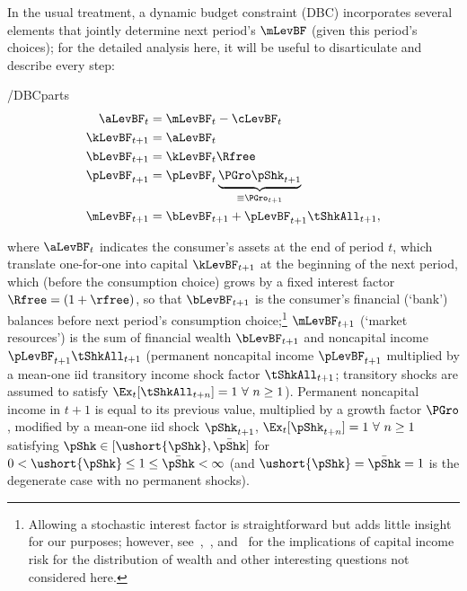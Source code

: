 \documentclass[BufferStockTheory]{subfiles}
\begin{document}
In the usual treatment, a dynamic budget constraint (DBC) incorporates
several elements that jointly determine next period's $\mLevBF$ (given this
period's choices); for the detailed analysis here, it will be useful to
disarticulate and describe every step:\hypertarget{DBCParts}{}
\begin{verbatimwrite}{\EqDir/DBCparts}
  \begin{align}
    \aLevBF_{t}    & = \mLevBF_{t}-\cLevBF_{t}  \label{eq:DBCparts} \\
    \kLevBF_{t+1}   & = \aLevBF_{t} \notag \\
    \bLevBF_{t+1}    & = \kLevBF_{t} \Rfree \notag \\
    \pLevBF_{t+1}  & = \pLevBF_{t} \underbrace{\PGro\pShk_{t+1}}_{\equiv \PGro_{t+1}}  \notag \\
    \mLevBF_{t+1}  & =  \bLevBF_{t+1} +\pLevBF_{t+1}\tShkAll_{t+1},  \notag
  \end{align}
\end{verbatimwrite}

where $\aLevBF_{t}$ indicates the consumer's assets at the end of period $t$, which translate one-for-one into capital $\kLevBF_{t+1}$ at the beginning of the next period, which (before the consumption choice) grows by a fixed interest factor $\Rfree =(1+\rfree)$,  so that $\bLevBF_{t+1}$ is the consumer's financial (`bank') balances before next period's consumption choice;\footnote{Allowing a stochastic interest factor is straightforward but adds little insight for our purposes; however, see~\cite{benhabibWealth},~\cite{maTodaRich}, and~\cite{mstIncFluct} for the implications of capital income risk for the distribution of wealth and other interesting questions not considered here.} $\mLevBF_{t+1}$ (`market resources') is the sum of financial wealth $\bLevBF_{t+1}$ and noncapital income $\pLevBF_{t+1}\tShkAll_{t+1}$ (permanent noncapital income $\pLevBF_{t+1}$ multiplied by a mean-one iid transitory income shock factor $\tShkAll_{t+1}$; transitory shocks are assumed to satisfy $\Ex_{t}[{\tShkAll}_{t+n}]=1~\forall~n\geq 1$). Permanent noncapital income in $t+1$ is equal to its previous value, multiplied by a growth factor $\PGro$, modified by a mean-one iid shock $\pShk_{t+1}$, $\Ex_{t}[{\pShk}_{t+n}]=1~\forall~n \geq 1$ satisfying $\pShk \in [\ushort{\pShk},\bar{\pShk}]$ for $0 < \ushort{\pShk} \leq 1 \leq \bar{\pShk} < \infty$ (and $\ushort{\pShk}=\bar{\pShk}=1$ is the degenerate case with no permanent shocks).
\end{document}
